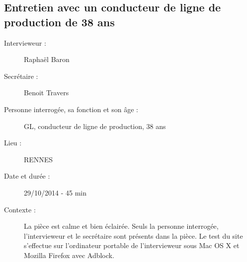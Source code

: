 \subsection{Entretien avec un conducteur de ligne de production de 38 ans}

\begin{description}
\item [Intervieweur : ] Rapha\"{e}l Baron
\item [Secr\'{e}taire : ] Benoit Travers
\item [Personne interrog\'{e}e, sa fonction et son \^{a}ge : ] GL, conducteur de ligne de production, 38 ans
\item [Lieu : ] RENNES
\item [Date et dur\'{e}e : ] 29/10/2014 - 45 min
\item [Contexte : ] La pi\`{e}ce est calme et bien \'{e}clair\'{e}e. Seuls la personne interrog\'{e}e, l'intervieweur et le secr\'{e}taire sont pr\'{e}sents dans la pi\`{e}ce. Le test du site s'effectue sur l'ordinateur portable de l'intervieweur sous Mac OS X et Mozilla Firefox avec Adblock. 

\end{description}


